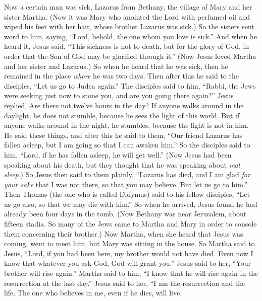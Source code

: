 \begin{biblechapter} %
 Now a certain man was sick, Lazarus from Bethany, the village of Mary and her sister Martha.
\verse (Now it was Mary who anointed the Lord with perfumed oil and wiped his feet with her hair, whose brother Lazarus was sick.)
\verse So the sisters sent word to him, saying, “Lord, behold, the one whom you love is sick.”
\verse And when he heard it, Jesus said, “This sickness is not to death, but for the glory of God, in order that the Son of God may be glorified through it.”
\verse (Now Jesus loved Martha and her sister and Lazarus.)
\verse So when he heard that he was sick, then he remained in the place \textit{where} he was two days.
\verse Then after this he said to the disciples, “Let us go to Judea again.”
\verse The disciples said to him, “Rabbi, the Jews were seeking just now to stone you, and are you going there again?”
\verse Jesus replied, Are there not twelve hours in the day? If anyone walks around in the daylight, he does not stumble, because he sees the light of this world.
\verse But if anyone walks around in the night, he stumbles, because the light is not in him.
\verse He said these things, and after this he said to them, “Our friend Lazarus has fallen asleep, but I am going so that I can awaken him.”
\verse So the disciples said to him, “Lord, if he has fallen asleep, he will get well.”
\verse (Now Jesus had been speaking about his death, but they thought that he was speaking about \textit{real sleep}.)
\verse So Jesus then said to them plainly, “Lazarus has died,
\verse and I am glad \textit{for your sake} that I was not there, so that you may believe. But let us go to him.”
\verse Then Thomas (the one who is called Didymus) said to his fellow disciples, “Let us go also, so that we may die with him.”
 So when he arrived, Jesus found he had already been four days in the tomb.
\verse (Now Bethany was near Jerusalem, about fifteen stadia.
\verse So many of the Jews came to Martha and Mary in order to console them concerning their brother.)
\verse Now Martha, when she heard that Jesus was coming, went to meet him, but Mary was sitting in the house.
\verse So Martha said to Jesus, “Lord, if you had been here, my brother would not have died.
\verse Even now I know that whatever you ask God, God will grant you.”
\verse Jesus said to her, “Your brother will rise again.”
\verse Martha said to him, “I know that he will rise again in the resurrection at the last day.”
\verse Jesus said to her, “I am the resurrection and the life. The one who believes in me, even if he dies, will live,

\end{biblechapter}
